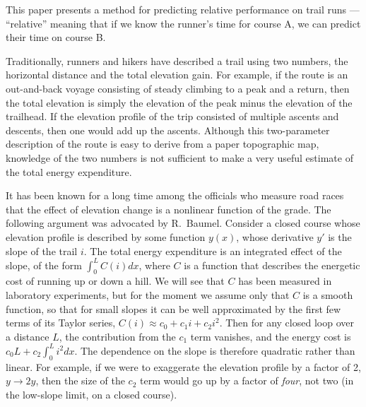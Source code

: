 \documentclass[10pt,letterpaper]{article}
\begin{document}

This paper presents a method for predicting relative performance on trail runs --- ``relative''
meaning that if we know the runner's time for course A, we can predict their time on course B.

Traditionally, runners and hikers have described a trail using two numbers, the horizontal distance and the total elevation gain.
For example, if the route is an out-and-back voyage consisting of steady climbing to a peak and
a return, then the total elevation is simply the elevation of the peak minus the elevation of
the trailhead. If the elevation profile of the trip consisted of multiple ascents and descents,
then one would add up the ascents. Although this two-parameter description of the route is
easy to derive from a paper topographic map, knowledge of the two numbers is not sufficient
to make a very useful estimate of the total energy expenditure.

It has been known for a long
time among the officials who measure road races that the effect
of elevation change is a nonlinear function of the grade. The following argument 
was advocated by R.~Baumel.\cite{baumel}
Consider a closed course whose elevation
profile is described by some function $y(x)$, whose derivative $y'$ is the slope of the trail $i$.
The total energy expenditure is an integrated effect of the slope, of the form $\int_0^L C(i)dx$,
where $C$ is a function that describes the energetic cost of running up or down a hill.
We will see that $C$ has been measured in laboratory experiments, but for the moment we assume
only that $C$ is a smooth function, so that for small slopes it can be well approximated by the first few terms
of its Taylor series, $C(i)\approx c_0+c_1 i+c_2 i^2$. Then for any closed loop over a distance $L$,
the contribution from the $c_1$ term vanishes, and the energy cost is $c_0 L+c_2 \int_0^L i^2 dx$.
The dependence on the slope is therefore quadratic rather than linear. For example, if we were to exaggerate the
elevation profile by a factor of 2, $y\rightarrow 2y$, then the size of the $c_2$ term would go up by
a factor of \emph{four}, not two (in the low-slope limit, on a closed course).
\end{document}

